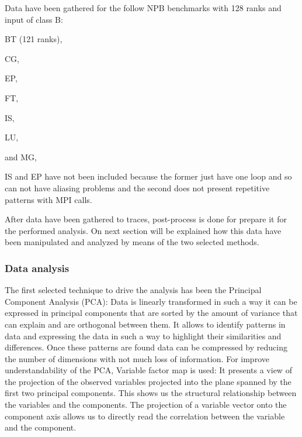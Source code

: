Data have been gathered for the follow NPB benchmarks with 128 ranks and input
of class B:
\begin{enumerate*}[label=\roman*)]
  \item BT (121 ranks),
  \item CG,
  \item EP,
  \item FT,
  \item IS,
  \item LU,
  \item and MG,
\end{enumerate*}
IS and EP have not been included because the former just have one loop and so
can not have aliasing problems and the second does not present repetitive
patterns with MPI calls.

After data have been gathered to traces, post-process is done for
prepare it for the performed analysis. On next section will be explained 
how this data have been manipulated and analyzed by means of the two selected 
methods. 

\subsubsection{Data analysis}

The first selected technique to drive the analysis has been the Principal 
Component Analysis (PCA): Data is linearly transformed in such a way it can be 
expressed in principal components that are sorted by the amount of variance 
that can explain and are orthogonal between them. It allows to identify patterns 
in data and expressing the data in such a way to highlight their similarities 
and differences. Once these patterns are found data can be compressed by reducing 
the number of dimensions with not much loss of information.  For improve
understandability of the PCA, Variable factor map is used: It
presents a view of the projection of the observed variables projected into the
plane spanned by the first two principal components. This shows us the
structural relationship between the variables and the components. The projection
of a variable vector onto the component axis allows us to directly read the
correlation between the variable and the component.

